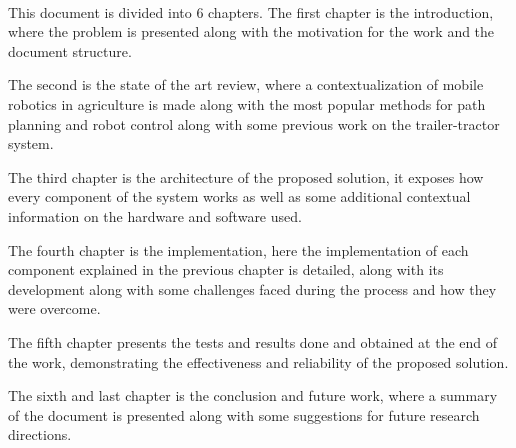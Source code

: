 \paragraph{}This document is divided into 6 chapters. The first chapter is the introduction, 
where the problem is presented along with the motivation for the work and the document structure. 

The second is the state of the art review, where a contextualization of mobile robotics in agriculture is made 
along with the most popular methods for path planning and robot control along with some previous work 
on the trailer-tractor system. 

The third chapter is the architecture of the proposed 
solution, it exposes how every component of the system works as well as some 
additional contextual information on the hardware and software used. 

The fourth 
chapter is the implementation, here the implementation of each component explained in the 
previous chapter is detailed, along with its development along with some 
challenges faced during the process and how they were overcome. 

The fifth 
chapter presents the tests and results done and obtained at the end of the work, 
demonstrating the effectiveness and reliability of the proposed solution. 

The sixth and last 
chapter is the conclusion and future work, where a summary of the document is 
presented along with some suggestions for future research directions.